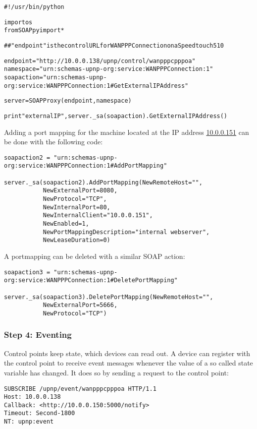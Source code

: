 \documentclass[10pt]{article}
\begin{document}
\begin{alltt}
#!/usr/bin/python

import os
from SOAPpy import *

## "endpoint" is the control URL for WANPPPConnection on a Speedtouch 510

endpoint = "http://10.0.0.138/upnp/control/wanpppcpppoa"
namespace = "urn:schemas-upnp-org:service:WANPPPConnection:1"
soapaction = "urn:schemas-upnp-org:service:WANPPPConnection:1#GetExternalIPAddress"

server = SOAPProxy(endpoint, namespace)

print "external IP", server._sa(soapaction).GetExternalIPAddress()
\end{alltt}

Adding a port mapping for the machine located at the IP address
\url{10.0.0.151} can be done with the following code:

\begin{verbatim}
soapaction2 = "urn:schemas-upnp-org:service:WANPPPConnection:1#AddPortMapping"

server._sa(soapaction2).AddPortMapping(NewRemoteHost="",
           NewExternalPort=8080,
           NewProtocol="TCP",
           NewInternalPort=80,
           NewInternalClient="10.0.0.151",
           NewEnabled=1,
           NewPortMappingDescription="internal webserver",
           NewLeaseDuration=0)
\end{verbatim}

A portmapping can be deleted with a similar SOAP action:

\begin{verbatim}
soapaction3 = "urn:schemas-upnp-org:service:WANPPPConnection:1#DeletePortMapping"

server._sa(soapaction3).DeletePortMapping(NewRemoteHost="",
           NewExternalPort=5666,
           NewProtocol="TCP")
\end{verbatim}


\subsubsection{Step 4: Eventing}

Control points keep state, which devices can read out. A device can register
with the control point to receive event messages whenever the value of a
so called state variable has changed. It does so by sending a request to the
control point:

\begin{verbatim}
SUBSCRIBE /upnp/event/wanpppcpppoa HTTP/1.1
Host: 10.0.0.138
Callback: <http://10.0.0.150:5000/notify>
Timeout: Second-1800
NT: upnp:event
\end{verbatim}
\end{document}
